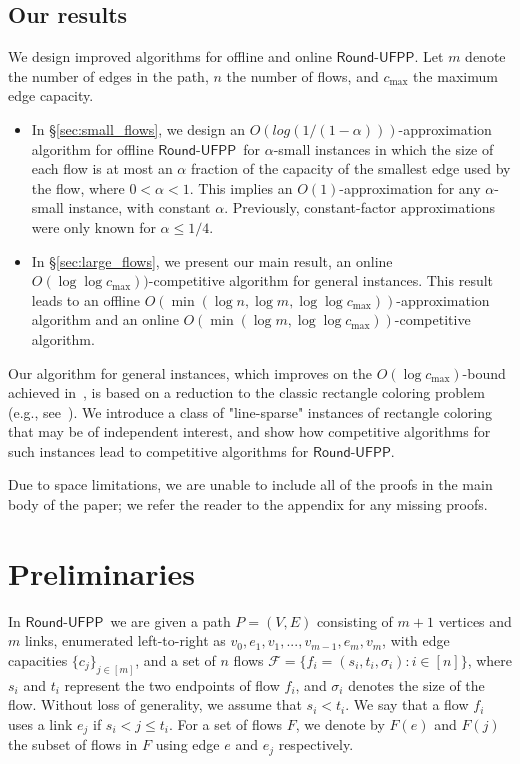 \documentclass[a4paper,UKenglish]{lipics-v2016}
\newcommand{\rufpp}{\mbox{$\mathsf{Round}$-$\mathsf{UFPP}$}}
\theoremstyle{plain}
\begin{document}
\subsection{Our results}
We design improved algorithms for offline and online \rufpp.  Let $m$ denote the number of edges in the path, $n$ the number of flows, and $c_{\max}$ the maximum edge capacity. 

\begin{itemize}
\item 
In \S\ref{sec:small_flows}, we design an $O(log(1/(1-\alpha)))$-approximation algorithm for offline \rufpp\ for $\alpha$-small instances
in which the size of each flow is at most an $\alpha$ fraction of the capacity of the smallest edge used by the flow, where $0<\alpha<1$.  This implies an $O(1)$-approximation for any $\alpha$-small instance, with constant $\alpha$.  Previously, constant-factor approximations were only known for $\alpha \le 1/4$.  

\item 
In \S\ref{sec:large_flows}, we present our main result, an online 
$O(\log\log c_{\max}))$-competitive algorithm for general instances.  
This result leads to an offline $O(\min (\log n, \log m, \log\log c_{\max}))$-approximation algorithm and an online $O(\min(\log m, \log\log c_{\max}))$-competitive algorithm.  
\end{itemize}
Our algorithm for general instances, which improves on the $O(\log c_{\max})$-bound achieved in~\cite{epstein}, is based on a reduction to the classic rectangle coloring problem (e.g., see~\cite{MathScand,Kostochka,Chalermsook2011}).  We introduce a class of "line-sparse" instances of rectangle coloring that may be of independent interest, and show how competitive algorithms for such instances lead to competitive algorithms for \rufpp.  

Due to space limitations, we are unable to include all of the proofs in the main body of the paper; we refer the reader to the appendix for any missing proofs.

\section{Preliminaries}
In \rufpp\, we are given a path $P=(V,E)$ consisting of $m+1$ vertices and $m$ links, enumerated left-to-right as $v_0, e_1, v_1, ..., v_{m-1}, e_m, v_m$, with edge capacities $\{c_j\}_{j\in [m]}$, and a set of $n$ flows $\mathcal{F}= \{f_i=(s_i, t_i, \sigma_i): i\in [n]\}$, where $s_i$ and $t_i$ represent the two endpoints of flow $f_i$, and $\sigma_i$ denotes the size of the flow. Without loss of generality, we assume that $s_i < t_i$. We say that a flow $f_i$ uses a link $e_j$ if $s_i < j \leq t_i$. For a set of flows $F$, we denote by $F(e)$ and $F(j)$ the subset of flows in $F$ using edge $e$ and $e_j$ respectively.
\end{document}
